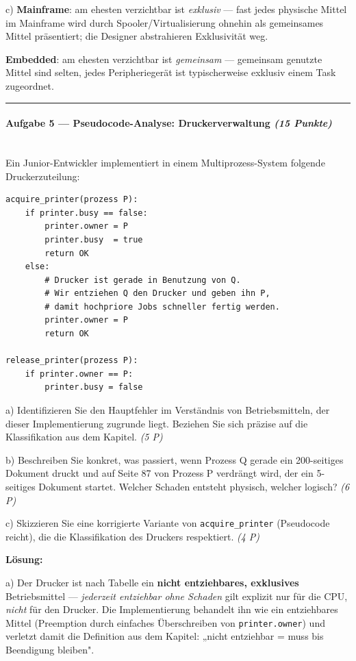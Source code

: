 \documentclass[11pt, a4paper]{article}
\begin{document}
c) \textbf{Mainframe}: am ehesten verzichtbar ist \textit{exklusiv} — fast jedes physische Mittel im Mainframe wird durch Spooler/Virtualisierung ohnehin als gemeinsames Mittel präsentiert; die Designer abstrahieren Exklusivität weg.

\textbf{Embedded}: am ehesten verzichtbar ist \textit{gemeinsam} — gemeinsam genutzte Mittel sind selten, jedes Peripheriegerät ist typischerweise exklusiv einem Task zugeordnet.



\noindent\textcolor{rulegray}{\rule{\linewidth}{0.4pt}}


\paragraph{Aufgabe 5 — Pseudocode-Analyse: Druckerverwaltung \textit{(15 Punkte)}}\mbox{}\\[2pt]

Ein Junior-Entwickler implementiert in einem Multiprozess-System folgende Druckerzuteilung:


\begin{lstlisting}
acquire_printer(prozess P):
    if printer.busy == false:
        printer.owner = P
        printer.busy  = true
        return OK
    else:
        # Drucker ist gerade in Benutzung von Q.
        # Wir entziehen Q den Drucker und geben ihn P,
        # damit hochpriore Jobs schneller fertig werden.
        printer.owner = P
        return OK

release_printer(prozess P):
    if printer.owner == P:
        printer.busy = false
\end{lstlisting}


a) Identifizieren Sie den Hauptfehler im Verständnis von Betriebsmitteln, der dieser Implementierung zugrunde liegt. Beziehen Sie sich präzise auf die Klassifikation aus dem Kapitel. \textit{(5 P)}


b) Beschreiben Sie konkret, was passiert, wenn Prozess Q gerade ein 200-seitiges Dokument druckt und auf Seite 87 von Prozess P verdrängt wird, der ein 5-seitiges Dokument startet. Welcher Schaden entsteht physisch, welcher logisch? \textit{(6 P)}


c) Skizzieren Sie eine korrigierte Variante von \texttt{acquire\_printer} (Pseudocode reicht), die die Klassifikation des Druckers respektiert. \textit{(4 P)}


\textbf{Lösung:}


a) Der Drucker ist nach Tabelle ein \textbf{nicht entziehbares, exklusives} Betriebsmittel — \textit{jederzeit entziehbar ohne Schaden} gilt explizit nur für die CPU, \textit{nicht} für den Drucker. Die Implementierung behandelt ihn wie ein entziehbares Mittel (Preemption durch einfaches Überschreiben von \texttt{printer.owner}) und verletzt damit die Definition aus dem Kapitel: „nicht entziehbar = muss bis Beendigung bleiben".
\end{document}
